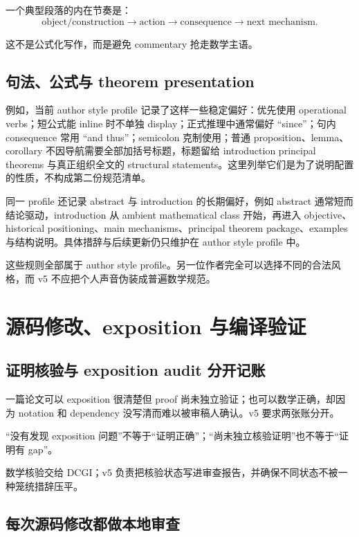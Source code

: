 \documentclass[UTF8,fontset=none,12pt,openany]{ctexbook}
\begin{document}
一个典型段落的内在节奏是：
\[
\text{object/construction}\to\text{action}\to\text{consequence}\to\text{next mechanism}.
\]

这不是公式化写作，而是避免 commentary 抢走数学主语。

\section{句法、公式与 theorem presentation}

例如，当前 author style profile 记录了这样一些稳定偏好：优先使用 operational verbs；短公式能 inline 时不单独 display；正式推理中通常偏好 “since”；句内 consequence 常用 “and thus”；semicolon 克制使用；普通 proposition、lemma、corollary 不因导航需要全部加括号标题，标题留给 introduction principal theorems 与真正组织全文的 structural statements。这里列举它们是为了说明配置的性质，不构成第二份规范清单。

同一 profile 还记录 abstract 与 introduction 的长期偏好，例如 abstract 通常短而结论驱动，introduction 从 ambient mathematical class 开始，再进入 objective、historical positioning、main mechanisms、principal theorem package、examples 与结构说明。具体措辞与后续更新仍只维护在 author style profile 中。

这些规则全部属于 author style profile。另一位作者完全可以选择不同的合法风格，而 v5 不应把个人声音伪装成普遍数学规范。

\chapter{源码修改、exposition 与编译验证}

\section{证明核验与 exposition audit 分开记账}

一篇论文可以 exposition 很清楚但 proof 尚未独立验证；也可以数学正确，却因为 notation 和 dependency 没写清而难以被审稿人确认。v5 要求两张账分开。

\begin{principle}[两张账]
“没有发现 exposition 问题”不等于“证明正确”；“尚未独立核验证明”也不等于“证明有 gap”。
\end{principle}

数学核验交给 DCGI；v5 负责把核验状态写进审查报告，并确保不同状态不被一种笼统措辞压平。

\section{每次源码修改都做本地审查}
\end{document}
